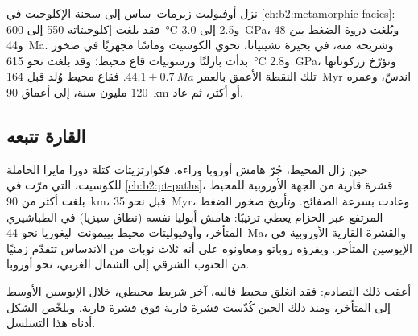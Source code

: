 نزل أوفيوليت زيرمات--ساس إلى سحنة الإكلوجيت في
\cref{ch:b2:metamorphic-facies}: فقد بلغت إكلوجيتاته 550 إلى \qty{600}{\celsius} و2.5 إلى
\qty{3.0}{GPa}، وبُلغت ذروة الضغط بين 48 و\qty{44}{Ma}. وشريحة منه،
في بحيرة تشينيانا، تحوي الكوسيت وماسًا مجهريًا في صخور بدأت بازلتًا
ورسوبيات قاع محيط؛ وقد بلغت نحو \qty{615}{\celsius} و\qty{2.8}{GPa}، وتؤرّخ
زركوناتها تلك النقطة الأعمق بالعمر $44.1 \pm \qty{0.7}{Ma}$. فقاع محيط وُلد
قبل \qty{164}{Myr} اندسّ، وعمره 120 مليون سنة، إلى أعماق
\qty{90}{km} أو أكثر، ثم عاد.

\subsection*{القارة تتبعه}

حين زال المحيط، جُرّ هامش أوروبا وراءه. فكوارتزيتات كتلة
دورا مايرا الحاملة للكوسيت، التي مرّت في \cref{ch:b2:pt-paths}، قشرة قارية
من الجهة الأوروبية للمحيط بلغت أكثر من \qty{90}{km}، قبل نحو
\qty{35}{Myr}، وعادت بسرعة الصفائح. وتأريخ صخور الضغط المرتفع
عبر الحزام يعطي ترتيبًا: هامش أبوليا نفسه (نطاق سيزيا) في الطباشيري
المتأخر، وأوفيوليتات محيط بييمونت--ليغوريا نحو \qty{44}{Ma}،
والقشرة القارية الأوروبية في الإيوسين المتأخر. ويقرؤه روباتو ومعاونوه على أنه ثلاث نوبات من الاندساس تتقدّم زمنيًا من
الجنوب الشرقي إلى الشمال الغربي، نحو أوروبا.

أعقب ذلك التصادم: فقد انغلق محيط فاليه، آخر شريط محيطي، خلال الإيوسين الأوسط إلى
المتأخر، ومنذ ذلك الحين كُدّست قشرة قارية فوق قشرة قارية.
ويلخّص الشكل أدناه هذا التسلسل.

